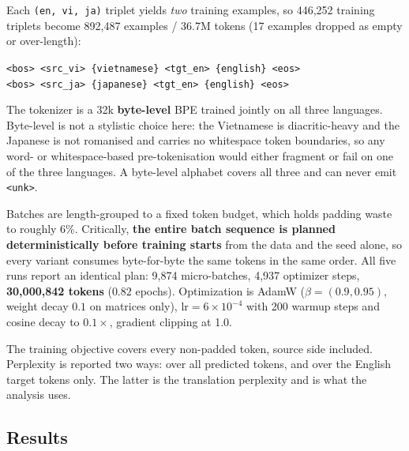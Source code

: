 \documentclass[11pt]{article}
\begin{document}
Each \texttt{(en, vi, ja)} triplet yields \emph{two} training examples, so
446{,}252 training triplets become 892{,}487 examples / 36.7M tokens (17
examples dropped as empty or over-length):

\begin{center}
\small
\texttt{<bos> <src\_vi> \{vietnamese\} <tgt\_en> \{english\} <eos>}\\
\texttt{<bos> <src\_ja> \{japanese\} <tgt\_en> \{english\} <eos>}
\end{center}

\noindent
The tokenizer is a 32k \textbf{byte-level} BPE trained jointly on all three
languages. Byte-level is not a stylistic choice here: the Vietnamese is
diacritic-heavy and the Japanese is not romanised and carries no whitespace token
boundaries, so any word- or whitespace-based pre-tokenisation would either
fragment or fail on one of the three languages. A byte-level alphabet covers all
three and can never emit \texttt{<unk>}.

Batches are length-grouped to a fixed token budget, which holds padding waste to
roughly 6\%. Critically, \textbf{the entire batch sequence is planned
deterministically before training starts} from the data and the seed alone, so
every variant consumes byte-for-byte the same tokens in the same order. All five
runs report an identical plan: 9{,}874 micro-batches, 4{,}937 optimizer steps,
\textbf{30{,}000{,}842 tokens} ($0.82$ epochs). Optimization is AdamW
($\beta{=}(0.9, 0.95)$, weight decay $0.1$ on matrices only), $\text{lr}
= 6\times10^{-4}$ with 200 warmup steps and cosine decay to $0.1\times$,
gradient clipping at 1.0.

The training objective covers every non-padded token, source side included.
Perplexity is reported two ways: over all predicted tokens, and over the English
target tokens only. The latter is the translation perplexity and is what the
analysis uses.

\subsection{Results}
\end{document}
